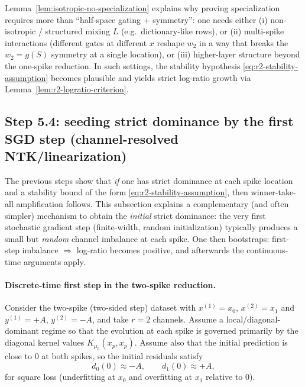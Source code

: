 \begin{remark}
Lemma~\ref{lem:isotropic-no-specialization} explains why proving specialization requires more than ``half-space gating + symmetry'':
one needs either (i) non-isotropic / structured mixing $L$ (e.g.\ dictionary-like rows), or (ii) multi-spike interactions (different gates at different $x$ reshape $w_2$ in a way that breaks the $w_2=g(S)$ symmetry at a single location), or (iii) higher-layer structure beyond the one-spike reduction.
In such settings, the stability hypothesis \eqref{eq:r2-stability-assumption} becomes plausible and yields strict log-ratio growth via Lemma~\ref{lem:r2-logratio-criterion}.
\end{remark}

\subsection{Step 5.4: seeding strict dominance by the first SGD step (channel-resolved NTK/linearization)}
\label{subsec:step54}

The previous steps show that \emph{if} one has strict dominance at each spike location and a stability bound of the form \eqref{eq:r2-stability-assumption}, then winner-take-all amplification follows.
This subsection explains a complementary (and often simpler) mechanism to obtain the \emph{initial} strict dominance: the very first stochastic gradient step (finite-width, random initialization) typically produces a small but \emph{random} channel imbalance at each spike.
One then bootstraps: first-step imbalance $\Rightarrow$ log-ratio becomes positive, and afterwards the continuous-time arguments apply.

\paragraph{Discrete-time first step in the two-spike reduction.}
Consider the two-spike (two-sided step) dataset with $x^{(1)}=x_0$, $x^{(2)}=x_1$ and $y^{(1)}=+A$, $y^{(2)}=-A$, and take $r=2$ channels.
Assume a local/diagonal-dominant regime so that the evolution at each spike is governed primarily by the diagonal kernel values $K_{\mu_0}(x_p,x_p)$.
Assume also that the initial prediction is close to $0$ at both spikes, so the initial residuals satisfy
\[
d_0(0)\approx -A,\qquad d_1(0)\approx +A,
\]
for square loss (underfitting at $x_0$ and overfitting at $x_1$ relative to $0$).

